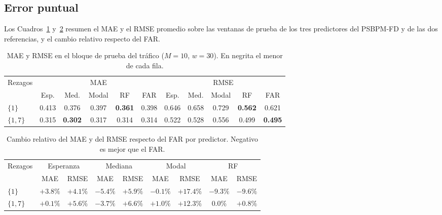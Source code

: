 \subsection{Error puntual}
\label{04_03_01_error_puntual}

Los Cuadros~\ref{tab:apl_bloqueA} y~\ref{tab:apl_bloqueA_ganancia} resumen el MAE y el RMSE promedio sobre las ventanas de prueba de los tres predictores del PSBPM-FD y de las dos referencias, y el cambio relativo respecto del FAR.

\begin{table}[H]
\centering\small
\setlength{\tabcolsep}{3.5pt}
\caption{MAE y RMSE en el bloque de prueba del tráfico ($M = 10$, $w = 30$). En negrita el menor de cada fila.}
\label{tab:apl_bloqueA}
\begin{tabular}{l ccccc ccccc}
\hline
Rezagos & \multicolumn{5}{c}{MAE} & \multicolumn{5}{c}{RMSE} \\
 & Esp. & Med. & Modal & RF & FAR & Esp. & Med. & Modal & RF & FAR \\
\hline
$\{1\}$ & 0.413 & 0.376 & 0.397 & \textbf{0.361} & 0.398 & 0.646 & 0.658 & 0.729 & \textbf{0.562} & 0.621 \\
$\{1,7\}$ & 0.315 & \textbf{0.302} & 0.317 & 0.314 & 0.314 & 0.522 & 0.528 & 0.556 & 0.499 & \textbf{0.495} \\
\hline
\end{tabular}
\end{table}

\begin{table}[H]
\centering\small
\setlength{\tabcolsep}{3.5pt}
\caption{Cambio relativo del MAE y del RMSE respecto del FAR por predictor. Negativo es mejor que el FAR.}
\label{tab:apl_bloqueA_ganancia}
\begin{tabular}{l cc cc cc cc}
\hline
Rezagos & \multicolumn{2}{c}{Esperanza} & \multicolumn{2}{c}{Mediana} & \multicolumn{2}{c}{Modal} & \multicolumn{2}{c}{RF} \\
 & MAE & RMSE & MAE & RMSE & MAE & RMSE & MAE & RMSE \\
\hline
$\{1\}$ & $+3.8\%$ & $+4.1\%$ & $-5.4\%$ & $+5.9\%$ & $-0.1\%$ & $+17.4\%$ & $-9.3\%$ & $-9.6\%$ \\
$\{1,7\}$ & $+0.1\%$ & $+5.6\%$ & $-3.7\%$ & $+6.6\%$ & $+1.0\%$ & $+12.3\%$ & $0.0\%$ & $+0.8\%$ \\
\hline
\end{tabular}
\end{table}

